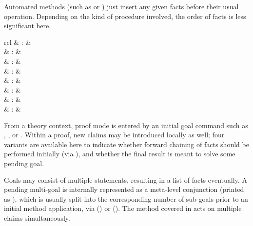 \begin{isabellebody}
\begin{isamarkuptext}
  Automated methods (such as \mbox{} or \mbox{}) just
  insert any given facts before their usual operation.  Depending on
  the kind of procedure involved, the order of facts is less
  significant here.%
\end{isamarkuptext}%
\isamarkuptrue%
%
\isamarkuptrue%
%
\begin{isamarkuptext}%
\begin{matharray}{rcl}
    \mbox{} & : &  \\
    \mbox{} & : &  \\
    \mbox{} & : &  \\
    \mbox{} & : &  \\
    \mbox{} & : &  \\
    \mbox{} & : &  \\
    \mbox{} & : &  \\
    \mbox{}\isa{{\isachardoublequote}\isactrlsup {\isacharasterisk}{\isachardoublequote}} & : &  \\
  \end{matharray}

  From a theory context, proof mode is entered by an initial goal
  command such as \mbox{}, \mbox{}, or
  \mbox{}.  Within a proof, new claims may be
  introduced locally as well; four variants are available here to
  indicate whether forward chaining of facts should be performed
  initially (via \mbox{}), and whether the final result
  is meant to solve some pending goal.

  Goals may consist of multiple statements, resulting in a list of
  facts eventually.  A pending multi-goal is internally represented as
  a meta-level conjunction (printed as \isa{{\isachardoublequote}{\isacharampersand}{\isacharampersand}{\isachardoublequote}}), which is usually
  split into the corresponding number of sub-goals prior to an initial
  method application, via \mbox{}
  () or \mbox{}
  ().  The \mbox{} method
  covered in  acts on multiple claims
  simultaneously.


\end{isamarkuptext}
\end{isabellebody}

